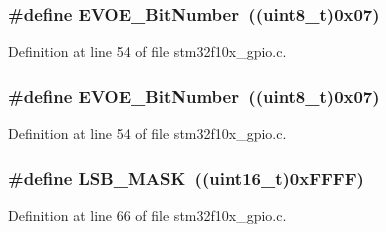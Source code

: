\subsubsection[{\texorpdfstring{E\+V\+O\+E\+\_\+\+Bit\+Number}{EVOE_BitNumber}}]{\setlength{\rightskip}{0pt plus 5cm}\#define E\+V\+O\+E\+\_\+\+Bit\+Number~(({\bf uint8\+\_\+t})0x07)}\hypertarget{group___g_p_i_o___private___defines_ga8e4fdee57fe3447cdbc5d00ccab60c18}{}\label{group___g_p_i_o___private___defines_ga8e4fdee57fe3447cdbc5d00ccab60c18}


Definition at line 54 of file stm32f10x\+\_\+gpio.\+c.

\subsubsection[{\texorpdfstring{E\+V\+O\+E\+\_\+\+Bit\+Number}{EVOE_BitNumber}}]{\setlength{\rightskip}{0pt plus 5cm}\#define E\+V\+O\+E\+\_\+\+Bit\+Number~(({\bf uint8\+\_\+t})0x07)}\hypertarget{group___g_p_i_o___private___defines_ga8e4fdee57fe3447cdbc5d00ccab60c18}{}\label{group___g_p_i_o___private___defines_ga8e4fdee57fe3447cdbc5d00ccab60c18}


Definition at line 54 of file stm32f10x\+\_\+gpio.\+c.

\subsubsection[{\texorpdfstring{L\+S\+B\+\_\+\+M\+A\+SK}{LSB_MASK}}]{\setlength{\rightskip}{0pt plus 5cm}\#define L\+S\+B\+\_\+\+M\+A\+SK~(({\bf uint16\+\_\+t})0x\+F\+F\+F\+F)}\hypertarget{group___g_p_i_o___private___defines_ga338d54179ac0da2af2363e3a930bf374}{}\label{group___g_p_i_o___private___defines_ga338d54179ac0da2af2363e3a930bf374}


Definition at line 66 of file stm32f10x\+\_\+gpio.\+c.

